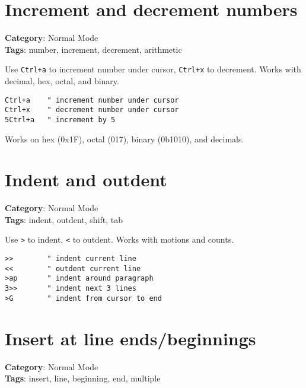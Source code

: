 {{{{{{{{{{\section{Increment and decrement numbers}

\textbf{Category}: Normal Mode\\ \textbf{Tags}: number, increment, decrement, arithmetic
\vspace{0.5cm}

Use {\footnotesize \Verb§Ctrl+a§} to increment number under cursor, {\footnotesize \Verb§Ctrl+x§} to decrement. Works with decimal, hex, octal, and binary.

\begin{Exa*}{}
\begin{Verbatim}[fontsize=\footnotesize, breaklines, breakanywhere]
Ctrl+a    " increment number under cursor
Ctrl+x    " decrement number under cursor
5Ctrl+a   " increment by 5
\end{Verbatim}
\end{Exa*}

Works on hex (0x1F), octal (017), binary (0b1010), and decimals.

\section{Indent and outdent}

\textbf{Category}: Normal Mode\\ \textbf{Tags}: indent, outdent, shift, tab
\vspace{0.5cm}

Use {\footnotesize \Verb§>§} to indent, {\footnotesize \Verb§<§} to outdent. Works with motions and counts.

\begin{Exa*}{}
\begin{Verbatim}[fontsize=\footnotesize, breaklines, breakanywhere]
>>        " indent current line
<<        " outdent current line
>ap       " indent around paragraph
3>>       " indent next 3 lines
>G        " indent from cursor to end
\end{Verbatim}
\end{Exa*}

\section{Insert at line ends/beginnings}

\textbf{Category}: Normal Mode\\ \textbf{Tags}: insert, line, beginning, end, multiple
\vspace{0.5cm}

}}}}}}}}}}
